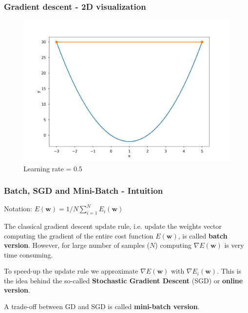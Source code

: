 \documentclass{beamer}
\begin{document}
	\begin{frame}
		\frametitle{Gradient descent - 2D visualization}
		\begin{figure}
			\centering
			\includegraphics[scale=0.3]{images/gradient_descent_3}
			\caption{Learning rate = 0.5}
		\end{figure}
	\end{frame}

	\begin{frame}
		\frametitle{Batch, SGD and Mini-Batch - Intuition}
		Notation: $E(\bm{w}) = 1/N \sum_{i=1}^N E_i(\bm{w})$
		
		\vspace{5mm}
		
		
		The classical gradient descent update rule, i.e. update the weights vector computing the gradient of the entire cost function $E(\bm{w})$, is called \textbf{batch version}. However, for large number of samples ($N$) computing $\nabla E(\bm{w})$ is very time consuming.
		
		\vspace{5mm}
		
		To speed-up the update rule we approximate $\nabla E(\bm{w})$ with $\nabla E_i(\bm{w})$. This is the idea behind the so-called \textbf{Stochastic Gradient Descent} (SGD) or \textbf{online version}.
		
		\vspace{5mm}
		
		A trade-off between GD and SGD is called \textbf{mini-batch version}.
	\end{frame}
\end{document}
